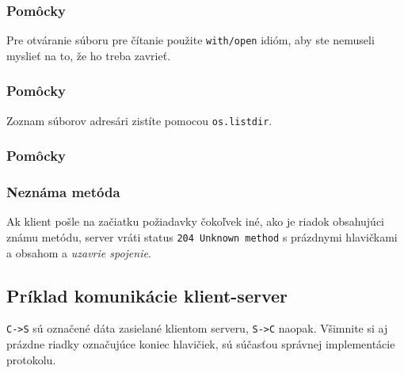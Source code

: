 \documentclass[11pt]{article}
\theoremstyle{definition}
\begin{document}
\subsubsection{Pomôcky}
Pre otváranie súboru pre čítanie použite \texttt{with/open} idióm,
aby ste nemuseli myslieť na to, že ho treba zavrieť.
\begin{framed}

\end{framed}

\subsubsection{Pomôcky}
Zoznam súborov adresári zistíte pomocou \texttt{os.listdir}.
\begin{framed}

\end{framed}

\subsubsection{Pomôcky}
\subsubsection{Neznáma metóda}
Ak klient pošle na začiatku požiadavky čokoľvek iné, ako je
riadok obsahujúci známu metódu, server vráti status \texttt{204 Unknown method} s
prázdnymi hlavičkami a obsahom a {\em uzavrie spojenie}.
\subsection{Príklad komunikácie klient-server}
\texttt{C->S} sú označené dáta zasielané klientom serveru, \texttt{S->C} naopak. Všimnite si aj prázdne riadky označujúce koniec hlavičiek, sú súčasťou správnej implementácie protokolu.
\begin{framed}

\end{framed}
\end{document}
